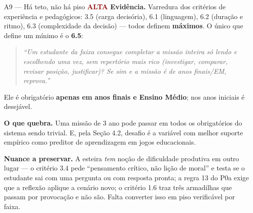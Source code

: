 \documentclass[11pt,a4paper]{article}
\newcommand{\sevalta}{\textcolor{DarkRed}{\textbf{ALTA}}}
\begin{document}
\begin{achadobox}{A9 --- H\'a teto, n\~ao h\'a piso \hfill \sevalta}
\textbf{Evid\^encia.} Varredura dos crit\'erios de experi\^encia e pedag\'ogicos: 3.5 (carga
decis\'oria), 6.1 (linguagem), 6.2 (dura\c{c}\~ao e ritmo), 6.3 (complexidade da decis\~ao) ---
todos definem \textbf{m\'aximos}. O \'unico que define um m\'inimo \'e o \textbf{6.5}:

\begin{quote}\small
\emph{``Um estudante da faixa consegue completar a miss\~ao inteira s\'o lendo e escolhendo uma
vez, sem repert\'orio mais rico (investigar, comparar, revisar posi\c{c}\~ao, justificar)? Se sim
e a miss\~ao \'e de anos finais/EM, reprova.''}
\end{quote}

Ele \'e obrigat\'orio \textbf{apenas em anos finais e Ensino M\'edio}; nos anos iniciais \'e
desej\'avel.

\textbf{O que quebra.} Uma miss\~ao de 3\textordmasculine{} ano pode passar em todos os
obrigat\'orios do sistema sendo trivial. E, pela Se\c{c}\~ao 4.2, desafio \'e a vari\'avel com
melhor suporte emp\'irico como preditor de aprendizagem em jogos educacionais.

\textbf{Nuance a preservar.} A esteira \emph{tem} no\c{c}\~ao de dificuldade produtiva em outro
lugar --- o crit\'erio 3.4 pede ``pensamento cr\'itico, n\~ao li\c{c}\~ao de moral'' e testa se o
estudante sai com uma pergunta ou com resposta pronta; a regra 13 do P0a exige que a reflex\~ao
aplique a cen\'ario novo; o crit\'erio 1.6 traz tr\^es armadilhas que passam por provoca\c{c}\~ao
e n\~ao s\~ao. Falta converter isso em piso verific\'avel por faixa.
\end{achadobox}
\end{document}
